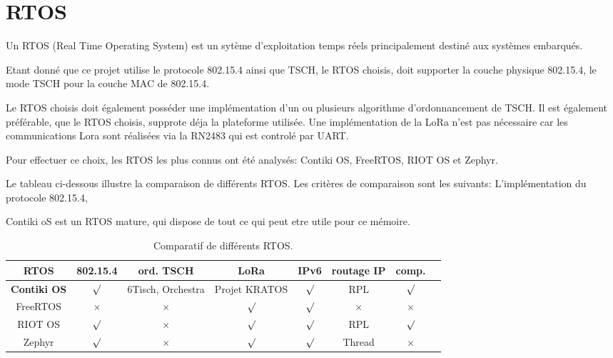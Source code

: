 \section{RTOS}

Un RTOS (Real Time Operating System) est un sytème d'exploitation temps réels principalement destiné aux systèmes embarqués.

Etant donné que ce projet utilise le protocole 802.15.4 ainsi que TSCH, le RTOS choisis, doit supporter la couche physique 802.15.4, le mode TSCH pour la couche MAC de 802.15.4.

Le RTOS choisis doit également posséder une implémentation d'un ou plusieurs algorithme d'ordonnancement de TSCH. Il est également préférable, que le RTOS choisis, supprote déja la plateforme utilisée. Une implémentation de la LoRa n'est pas nécessaire car les communications Lora sont réalisées via la RN2483 qui est controlé par UART.

Pour effectuer ce choix, les RTOS les plus connus ont été analysés: Contiki OS, FreeRTOS, RIOT OS et Zephyr.

Le tableau ci-dessous illustre la comparaison de différents RTOS. Les critères de comparaison
sont les suivants: L'implémentation du protocole 802.15.4, 

Contiki oS est un RTOS mature, qui dispose de tout ce qui peut etre utile pour ce mémoire.




\begin{table}[H]
    \begin{adjustbox}{width=\textwidth}
        \begin{tabular}{c||c|c|c|c|c|c|c}
            RTOS                & 802.15.4 & ord. TSCH         & LoRa          & IPv6    & routage IP & comp.   \\ \hline

            \textbf{Contiki OS} & $\surd$  & 6Tisch, Orchestra & Projet KRATOS & $\surd$ & RPL        & $\surd$ \\ \hline

            FreeRTOS            & $\times$ & $\times$          & $\surd$       & $\surd$ & $\times$   &    $\times$     \\ \hline

            RIOT OS             & $\surd$  & $\times$          & $\surd$       & $\surd$ & RPL        &    $\surd$     \\ \hline

            Zephyr              & $\surd$  & $\times$          & $\surd$       & $\surd$ & Thread     &    $\times$     \\
        \end{tabular}
    \end{adjustbox}
    \caption{Comparatif de différents RTOS.}
    \label{tb:state-rtos-choice}
\end{table}